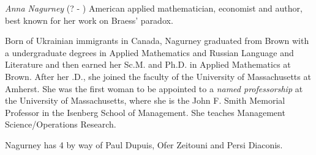 \documentclass[12pt]{article}
\begin{document}

\emph{Anna Nagurney} (? - ) American applied mathematician, economist and author, best known for her work on Braess' paradox.

Born of Ukrainian immigrants in Canada, Nagurney graduated from Brown with a undergraduate degrees in Applied Mathematics and Russian Language and Literature and then earned her Sc.M. and Ph.D. in Applied Mathematics at Brown. After her .D., she joined the faculty of the University of Massachusetts at Amherst. She was the first woman to be appointed to a {\it named professorship} at the University of Massachusetts, where she is the John F. Smith Memorial Professor in the Isenberg School of Management. She teaches Management Science/Operations Research.

Nagurney has  4 by way of Paul Dupuis, Ofer Zeitouni and Persi Diaconis.

\end{document}
